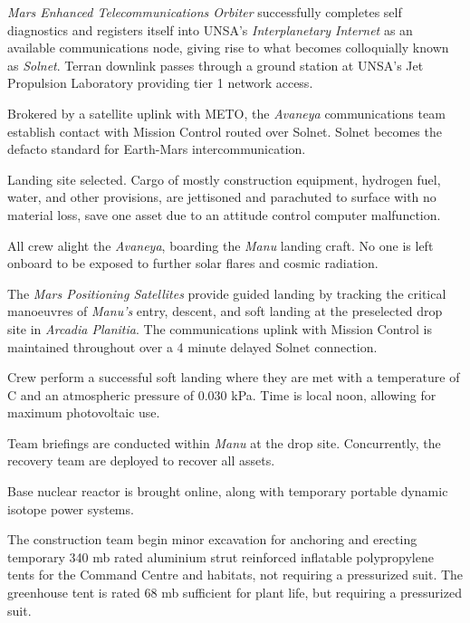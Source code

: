 {\it Mars Enhanced Telecommunications Orbiter} successfully completes self diagnostics and registers itself into UNSA's {\it Interplanetary Internet} as an available communications node, giving rise to what becomes colloquially known as {\it Solnet}. Terran downlink passes through a ground station at UNSA's Jet Propulsion Laboratory providing tier 1 network access.

Brokered by a satellite uplink with METO, the {\it Avaneya} communications team establish contact with Mission Control routed over Solnet. Solnet becomes the defacto standard for Earth-Mars intercommunication.
\StopTimelineDate

Landing site selected. Cargo of mostly construction equipment, hydrogen fuel, water, and other provisions, are jettisoned and parachuted to surface with no material loss, save one asset due to an attitude control computer malfunction.
\StopTimelineDate

All crew alight the {\it Avaneya}, boarding the {\it Manu} landing craft. No one is left onboard to be exposed to further solar flares and cosmic radiation.

The {\it Mars Positioning Satellites} provide guided landing by tracking the critical manoeuvres of {\it Manu's} entry, descent, and soft landing at the preselected drop site in {\it Arcadia Planitia}. The communications uplink with Mission Control is maintained throughout over a 4 minute delayed Solnet connection.

Crew perform a successful soft landing where they are met with a temperature of C and an atmospheric pressure of 0.030 kPa. Time is local noon, allowing for maximum photovoltaic use.

Team briefings are conducted within {\it Manu} at the drop site. Concurrently, the recovery team are deployed to recover all assets.

Base nuclear reactor is brought online, along with temporary portable dynamic isotope power systems.

The construction team begin minor excavation for anchoring and erecting temporary 340 mb rated aluminium strut reinforced inflatable polypropylene tents for the Command Centre and habitats, not requiring a pressurized suit. The greenhouse tent is rated 68 mb sufficient for plant life, but requiring a pressurized suit.
\StopTimelineDate

